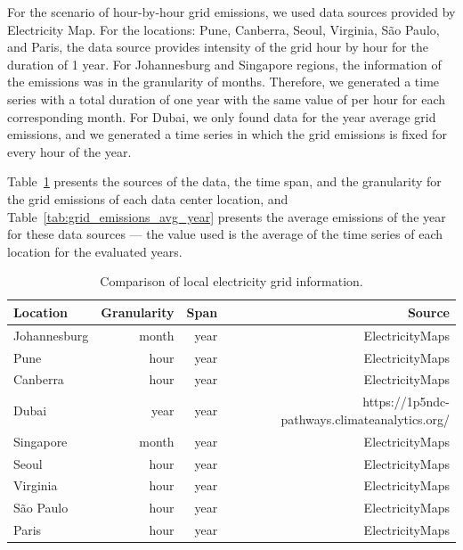For the scenario of hour-by-hour grid emissions, we used data sources provided by Electricity Map. For the locations: Pune, Canberra, Seoul, Virginia, São Paulo, and Paris, the data source provides  intensity of the grid hour by hour for the duration of 1 year. For Johannesburg and Singapore regions, the information of the  emissions was in the granularity of months. Therefore, we generated a time series with a total duration of one year with the same value of  per hour for each corresponding month. For Dubai, we only found data for the year average grid  emissions, and we generated a time series in which the grid emissions is fixed for every hour of the year.


Table~\ref{tab:grid_emissions_hist} presents the sources of the data, the time span, and the granularity for the grid emissions of each data center location, and Table~\ref{tab:grid_emissions_avg_year} presents the average  emissions of the year for these data sources --- the value used is the average of the time series of each location for the evaluated years.


\begin{table}[h]  
\caption{Comparison of local electricity grid  information. }\label{tab:grid_emissions_hist} \centering  
  \begin{tabular}{|l|r|r|r|}
    \hline
    
  \textbf{Location} &   \textbf{Granularity} & \textbf{Span} & \textbf{Source} \\
  \hline
  Johannesburg & month & year & ElectricityMaps  \\
  \hline
  Pune  & hour & year & ElectricityMaps  \\
  \hline
  Canberra  & hour &  year & ElectricityMaps \\
  \hline
  Dubai    & year & year & https://1p5ndc-pathways.climateanalytics.org/  \\
  \hline
  Singapore & month & year & ElectricityMaps \\
  \hline     
  Seoul     & hour & year & ElectricityMaps \\
  \hline
  Virginia  &  hour & year & ElectricityMaps \\
  \hline
  São Paulo & hour & year  & ElectricityMaps \\
  \hline 
  Paris     & hour & year  & ElectricityMaps  \\
  \hline
\end{tabular}  
\end{table}


